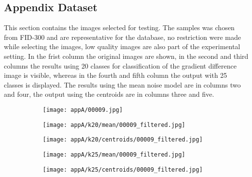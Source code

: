 \documentclass[draft,final]{vutinfth} %
\begin{document}
\begin{appendices}
		\chapter{Appendix Dataset}
		\label{AppA}
		This section contains the images selected for testing.
		The samples was chosen from FID-300 and are representative for the database, no restriction were made while selecting the images, low quality images are also part of the experimental setting.
		In the frist column the original images are shown, in the second and third columns the results using 20 classes for classification of the gradient difference image is visible, whereas in the fourth and fifth column the output with 25 classes is displayed.
		The results using the mean noise model are in columns two and four, the output using the centroids are in columns three and five.
\begin{figure}[h]
\centering
  \begin{subfigure}[t]{0.19\columnwidth}
    \centering
    \texttt{[image: appA/00009.jpg]}
  \end{subfigure}
  \begin{subfigure}[t]{0.19\columnwidth}
    \centering
    \texttt{[image: appA/k20/mean/00009\_filtered.jpg]}
  \end{subfigure}
  \begin{subfigure}[t]{0.19\columnwidth}
    \centering
    \texttt{[image: appA/k20/centroids/00009\_filtered.jpg]}
  \end{subfigure}
  \begin{subfigure}[t]{0.19\columnwidth}
    \centering
    \texttt{[image: appA/k25/mean/00009\_filtered.jpg]}
  \end{subfigure}
  \begin{subfigure}[t]{0.19\columnwidth}
    \centering
    \texttt{[image: appA/k25/centroids/00009\_filtered.jpg]}
  \end{subfigure}
\caption{}
\end{figure}  


\end{appendices}
\end{document}
